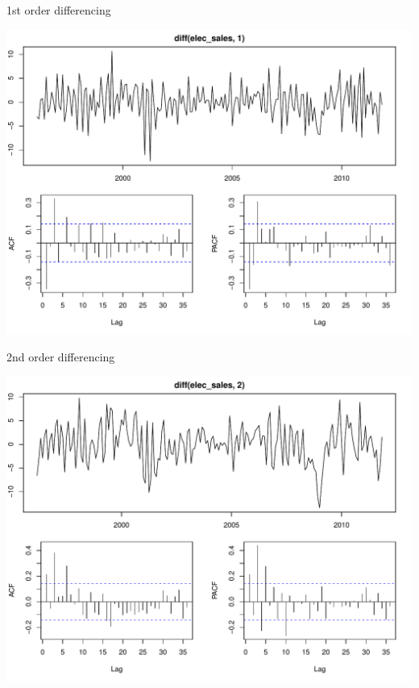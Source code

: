 \documentclass[11pt,ignorenonframetext,]{beamer}
\begin{document}
\begin{frame}{1st order differencing}

\includegraphics{Lec9_files/figure-beamer/unnamed-chunk-14-1.pdf}

\end{frame}

\begin{frame}{2nd order differencing}

\includegraphics{Lec9_files/figure-beamer/unnamed-chunk-15-1.pdf}

\end{frame}
\end{document}
